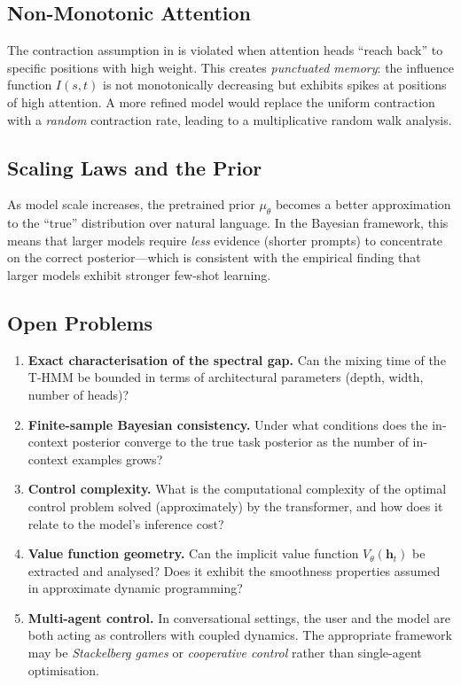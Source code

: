 \documentclass[11pt,a4paper]{article}
\theoremstyle{plain}
\theoremstyle{definition}
\theoremstyle{remark}
\begin{document}
\subsection{Non-Monotonic Attention}

The contraction assumption in  is violated when attention heads
``reach back'' to specific positions with high weight. This creates
\emph{punctuated memory}: the influence function $I(s,t)$ is not monotonically
decreasing but exhibits spikes at positions of high attention. A more refined
model would replace the uniform contraction with a \emph{random} contraction
rate, leading to a multiplicative random walk analysis.

\subsection{Scaling Laws and the Prior}

As model scale increases, the pretrained prior $\mu_\theta$ becomes a
better approximation to the ``true'' distribution over natural language.
In the Bayesian framework, this means that larger models require \emph{less}
evidence (shorter prompts) to concentrate on the correct posterior---which
is consistent with the empirical finding that larger models exhibit stronger
few-shot learning.

\subsection{Open Problems}

\begin{enumerate}[nosep]
  \item \textbf{Exact characterisation of the spectral gap.} Can the mixing
        time of the T-HMM be bounded in terms of architectural parameters
        (depth, width, number of heads)?

  \item \textbf{Finite-sample Bayesian consistency.} Under what conditions does
        the in-context posterior converge to the true task posterior as the number
        of in-context examples grows?

  \item \textbf{Control complexity.} What is the computational complexity of the
        optimal control problem solved (approximately) by the transformer, and
        how does it relate to the model's inference cost?

  \item \textbf{Value function geometry.} Can the implicit value function
        $V_\theta(\bm{h}_t)$ be extracted and analysed? Does it exhibit the
        smoothness properties assumed in approximate dynamic programming?

  \item \textbf{Multi-agent control.} In conversational settings, the user and
        the model are both acting as controllers with coupled dynamics. The
        appropriate framework may be \emph{Stackelberg games} or
        \emph{cooperative control} rather than single-agent optimisation.
\end{enumerate}
\end{document}
